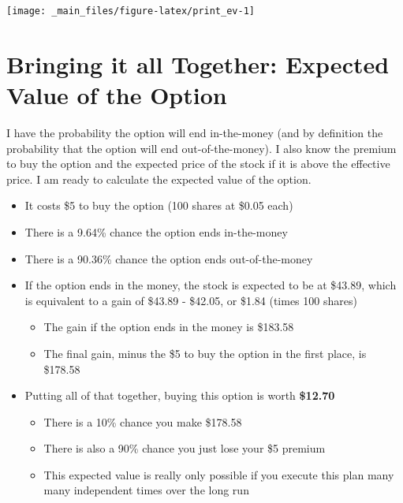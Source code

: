 \documentclass[
]{book}
\providecommand{\tightlist}{%
  \setlength{\itemsep}{0pt}\setlength{\parskip}{0pt}}
\begin{document}
\begin{center}\texttt{[image: \_main\_files/figure-latex/print\_ev-1]} \end{center}

\hypertarget{bringing-it-all-together-expected-value-of-the-option}{%
\section{Bringing it all Together: Expected Value of the Option}\label{bringing-it-all-together-expected-value-of-the-option}}

I have the probability the option will end in-the-money (and by definition the
probability that the option will end out-of-the-money). I also know the premium
to buy the option and the expected price of the stock if it is above the
effective price. I am ready to calculate the expected value of the option.

\begin{itemize}
\tightlist
\item
  It costs \$5 to buy the option (100 shares at \$0.05 each)
\item
  There is a 9.64\% chance
  the option ends in-the-money
\item
  There is a 90.36\% chance the option ends
  out-of-the-money
\item
  If the option ends in the money, the stock is expected to be at
  \$43.89, which is equivalent to a gain of \$43.89 -
  \$42.05, or \$1.84 (times 100 shares)

  \begin{itemize}
  \tightlist
  \item
    The gain if the option ends in the money is \$183.58
  \item
    The final gain, minus the \$5 to buy the option in the first place, is
    \$178.58
  \end{itemize}
\item
  Putting all of that together, buying this option is worth
  \textbf{\$12.70}

  \begin{itemize}
  \tightlist
  \item
    There is a 10\% chance you make \$178.58
  \item
    There is also a 90\% chance you just lose your \$5 premium
  \item
    This expected value is really only possible if you execute this plan
    many many independent times over the long run
  \end{itemize}
\end{itemize}
\end{document}
